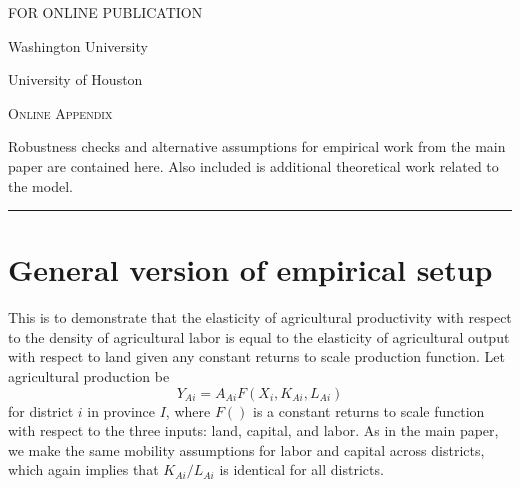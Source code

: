 \documentclass[11pt]{article}
\begin{document}
\begin{titlepage}
\hfill \textsc{FOR ONLINE PUBLICATION}

\vspace{1in} \noindent {\large \today}

\vspace{.5in} 

\vspace{.25in} 

\vspace{.05in} \noindent Washington University

\vspace{.25in} 

\vspace{.05in} \noindent University of Houston

\vspace{2in} \noindent \textsc{Online Appendix} \hrulefill

\vspace{.05in} \noindent Robustness checks and alternative assumptions for empirical work from the main paper are contained here. Also included is additional theoretical work related to the model.
\vspace{.1in} \hrule

\end{titlepage}

\pagebreak 

\tableofcontents

\section{General version of empirical setup}
This is to demonstrate that the elasticity of agricultural productivity with respect to the density of agricultural labor is equal to the elasticity of agricultural output with respect to land given any constant returns to scale production function. Let agricultural production be
\begin{equation}
    Y_{Ai} = A_{Ai} F(X_i,K_{Ai},L_{Ai}) 
\end{equation}
for district $i$ in province $I$, where $F()$ is a constant returns to scale function with respect to the three inputs: land, capital, and labor. As in the main paper, we make the same mobility assumptions for labor and capital across districts, which again implies that $K_{Ai}/L_{Ai}$ is identical for all districts. 
\end{document}
